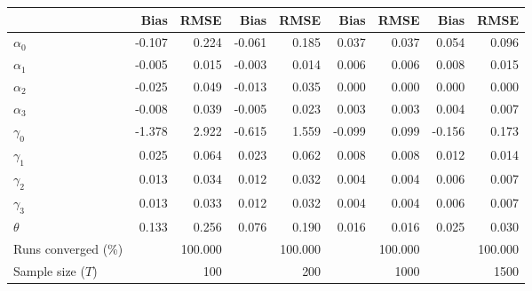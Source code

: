 
\begin{tabular}[t]{lrrrrrrrr}
\toprule
  & Bias & RMSE & Bias & RMSE & Bias & RMSE & Bias & RMSE\\
\midrule
$\alpha_{0}$ & -0.107 & 0.224 & -0.061 & 0.185 & 0.037 & 0.037 & 0.054 & 0.096\\
$\alpha_{1}$ & -0.005 & 0.015 & -0.003 & 0.014 & 0.006 & 0.006 & 0.008 & 0.015\\
$\alpha_{2}$ & -0.025 & 0.049 & -0.013 & 0.035 & 0.000 & 0.000 & 0.000 & 0.000\\
$\alpha_{3}$ & -0.008 & 0.039 & -0.005 & 0.023 & 0.003 & 0.003 & 0.004 & 0.007\\
$\gamma_{0}$ & -1.378 & 2.922 & -0.615 & 1.559 & -0.099 & 0.099 & -0.156 & 0.173\\
$\gamma_{1}$ & 0.025 & 0.064 & 0.023 & 0.062 & 0.008 & 0.008 & 0.012 & 0.014\\
$\gamma_{2}$ & 0.013 & 0.034 & 0.012 & 0.032 & 0.004 & 0.004 & 0.006 & 0.007\\
$\gamma_{3}$ & 0.013 & 0.033 & 0.012 & 0.032 & 0.004 & 0.004 & 0.006 & 0.007\\
$\theta$ & 0.133 & 0.256 & 0.076 & 0.190 & 0.016 & 0.016 & 0.025 & 0.030\\
Runs converged (\%) &  & 100.000 &  & 100.000 &  & 100.000 &  & 100.000\\
Sample size ($T$) &  & 100 &  & 200 &  & 1000 &  & 1500\\
\bottomrule
\end{tabular}
